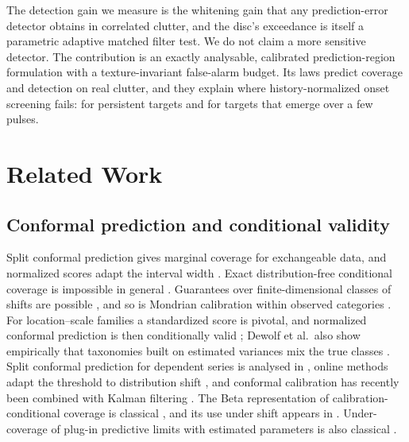 \documentclass[journal]{IEEEtran}
\begin{document}
The detection gain we measure is the whitening gain that any prediction-error detector obtains in correlated clutter, and the disc's exceedance is itself a parametric adaptive matched filter test. We do not claim a more sensitive detector. The contribution is an exactly analysable, calibrated prediction-region formulation with a texture-invariant false-alarm budget. Its laws predict coverage and detection on real clutter, and they explain where history-normalized onset screening fails: for persistent targets and for targets that emerge over a few pulses.

\section{Related Work}
\subsection{Conformal prediction and conditional validity}
Split conformal prediction gives marginal coverage for exchangeable data, and normalized scores adapt the interval width \cite{lei2018}. Exact distribution-free conditional coverage is impossible in general \cite{barber2021limits}. Guarantees over finite-dimensional classes of shifts are possible \cite{gibbs2025}, and so is Mondrian calibration within observed categories \cite{vovk2012,bostrom2020}. For location--scale families a standardized score is pivotal, and normalized conformal prediction is then conditionally valid \cite{dewolf2025}; Dewolf et al.\ also show empirically that taxonomies built on estimated variances mix the true classes \cite[\S5.2]{dewolf2025}. Split conformal prediction for dependent series is analysed in \cite{barber2023,barber2026,zhai2026}, online methods adapt the threshold to distribution shift \cite{gibbs2021aci,xu2023spci}, and conformal calibration has recently been combined with Kalman filtering \cite{weisman2026ckf}. The Beta representation of calibration-conditional coverage is classical \cite{vovk2012}, and its use under shift appears in \cite{ramos2026}. Under-coverage of plug-in predictive limits with estimated parameters is also classical \cite{barndorff1996,lawless2005,vidoni2009}.
\end{document}
